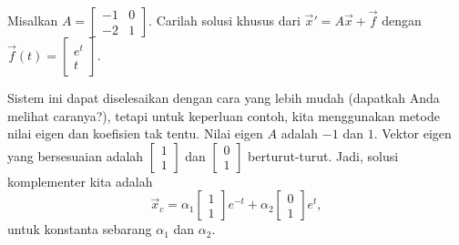 \begin{example}
Misalkan $A = \left[
\begin{smallmatrix}
-1 & 0 \\
-2 & 1
\end{smallmatrix} \right]$.
Carilah solusi khusus dari ${\vec{x}}' = A \vec{x} +
\vec{f}$ dengan $\vec{f}(t) = 
\left[ \begin{smallmatrix}
e^t \\
t
\end{smallmatrix} \right]$.

Sistem ini dapat diselesaikan dengan cara yang lebih mudah (dapatkah Anda melihat caranya?), tetapi
untuk keperluan contoh, kita menggunakan metode nilai eigen dan
koefisien tak tentu.
Nilai eigen $A$ adalah 
$-1$ dan $1$.
Vektor eigen yang bersesuaian adalah
$\left[ \begin{smallmatrix}
1 \\
1
\end{smallmatrix} \right]$ dan
$\left[ \begin{smallmatrix}
0 \\
1
\end{smallmatrix} \right]$ berturut-turut.
Jadi, solusi komplementer kita adalah
\begin{equation*}
\vec{x}_c = 
\alpha_1
\begin{bmatrix}
1 \\ 1
\end{bmatrix}
e^{-t}
+
\alpha_2
\begin{bmatrix}
0 \\ 1
\end{bmatrix}
e^{t} ,
\end{equation*}
untuk konstanta sebarang $\alpha_1$ dan $\alpha_2$.


\end{example}

